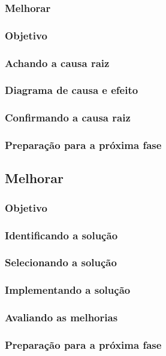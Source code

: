 \documentclass{abnt}
\begin{document}
					\subsubsection {Melhorar}
					\subsubsection {Objetivo}
					\subsubsection {Achando a causa raiz}
					\subsubsection {Diagrama de causa e efeito}
					\subsubsection {Confirmando a causa raiz}
					\subsubsection {Preparação para a próxima fase}
				\subsection {Melhorar}
					\subsubsection {Objetivo}
					\subsubsection {Identificando a solução}
					\subsubsection {Selecionando a solução}
					\subsubsection {Implementando a solução}
					\subsubsection {Avaliando as melhorias}
					\subsubsection {Preparação para a próxima fase}
\end{document}

